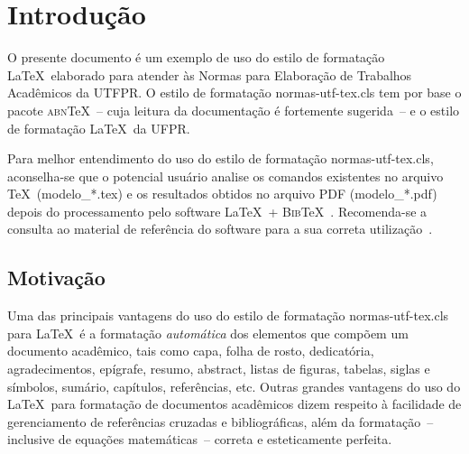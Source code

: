 \documentclass[openright]{normas-utf-tex} %
\begin{document}
%
%
%
%


\setcounter{page}{11}

\chapter{Introdução}
\label{chap:introducao}

O presente documento é um exemplo de uso do estilo de formatação \LaTeX\ elaborado para atender às Normas para Elaboração de Trabalhos Acadêmicos da UTFPR. O estilo de formatação {\ttfamily normas-utf-tex.cls} tem por base o pacote \textsc{abn}\TeX~-- cuja leitura da documentação \cite{abnTeX2009} é fortemente sugerida~-- e o estilo de formatação \LaTeX\ da UFPR.

Para melhor entendimento do uso do estilo de formatação {\ttfamily normas-utf-tex.cls}, aconselha-se que o potencial usuário analise os comandos existentes no arquivo \TeX\ ({\ttfamily modelo\_*.tex}) e os resultados obtidos no arquivo PDF ({\ttfamily modelo\_*.pdf}) depois do processamento pelo software \LaTeX\ + \textsc{Bib}\TeX~\cite{LaTeX2009,BibTeX2009}. Recomenda-se a consulta ao material de referência do software para a sua correta utilização~\cite{Lamport1986,Buerger1989,Kopka2003,Mittelbach2004}.

\section{Motivação}
\label{sec:motivacao}

Uma das principais vantagens do uso do estilo de formatação {\ttfamily normas-utf-tex.cls} para \LaTeX\ é a formatação \textit{automática} dos elementos que compõem um documento acadêmico, tais como capa, folha de rosto, dedicatória, agradecimentos, epígrafe, resumo, abstract, listas de figuras, tabelas, siglas e símbolos, sumário, capítulos, referências, etc. Outras grandes vantagens do uso do \LaTeX\ para formatação de documentos acadêmicos dizem respeito à facilidade de gerenciamento de referências cruzadas e bibliográficas, além da formatação~-- inclusive de equações  matemáticas~-- correta e esteticamente perfeita.
\end{document}
